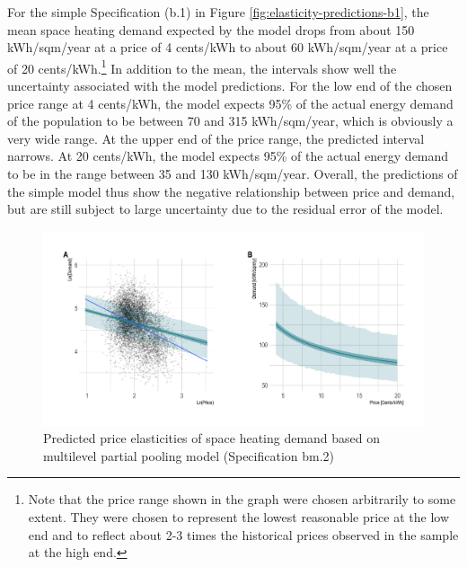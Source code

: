 \documentclass[12pt,twoside]{reedthesis}
\begin{document}
For the simple Specification (b.1) in Figure \ref{fig:elasticity-predictions-b1}, the mean space heating demand expected by the model drops from about 150 kWh/sqm/year at a price of 4 cents/kWh to about 60 kWh/sqm/year at a price of 20 cents/kWh.\footnote{Note that the price range shown in the graph were chosen arbitrarily to some extent. They were chosen to represent the lowest reasonable price at the low end and to reflect about 2-3 times the historical prices observed in the sample at the high end.} In addition to the mean, the intervals show well the uncertainty associated with the model predictions. For the low end of the chosen price range at 4 cents/kWh, the model expects 95\% of the actual energy demand of the population to be between 70 and 315 kWh/sqm/year, which is obviously a very wide range. At the upper end of the price range, the predicted interval narrows. At 20 cents/kWh, the model expects 95\% of the actual energy demand to be in the range between 35 and 130 kWh/sqm/year. Overall, the predictions of the simple model thus show the negative relationship between price and demand, but are still subject to large uncertainty due to the residual error of the model.
\begin{figure}

{\centering \includegraphics[width=1.04\linewidth]{figure/bm2_prediction} 

}

\caption{Predicted price elasticities of space heating demand based on multilevel partial pooling model (Specification bm.2)}\label{fig:elasticity-predictions-bm2}
\end{figure}
\end{document}
